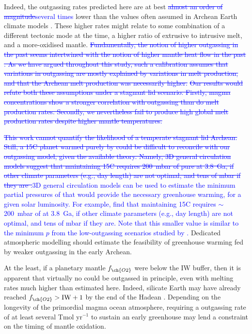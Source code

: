 \documentclass[3p,authoryear]{elsarticle}
\newcommand{\editthree}[2]{\textcolor{blue}{\sout{#1}#2}}
\begin{document}
Indeed, the  outgassing rates predicted here are at best \editthree{almost an order of magnitude}{several times} lower than the values often assumed in Archean Earth climate models \citep[e.g.][]{Sleep2001, Wordsworth2013, CHARNAY2017, KANZAKI2018, KT2018}. These higher rates might relate to some combination of a different tectonic mode at the time, a higher ratio of extrusive to intrusive melt, and a more-oxidised mantle. \editthree{Fundamentally, the notion of higher outgassing in the past seems intertwined with the notion of higher mantle heat flow in the past \citep[e.g.,][]{TURCOTTE1980}. As we have argued throughout this study, such a calibration assumes that variations in outgassing are mostly explained by variations in melt production, and that the Archean melt production was necessarily higher.}{} \editthree{Our results would refute both these assumptions under a stagnant lid scenario. Firstly, \ch{CO2} magma concentrations show a stronger correlation with \ch{CO2} outgassing than do melt production rates. Secondly, we nevertheless fail to produce high global melt production rates despite higher mantle temperatures.}{} 



\editthree{This work cannot quantify the likelihood of a temperate stagnant lid Archean. Still, a 15\degree C planet warmed purely by \ch{CO2} could be difficult to reconcile with our outgassing model, given the available theory. Namely, 3D general circulation models suggest that maintaining 15\degree C requires 200~mbar of pure \ch{CO2} at 3.8~Ga, if other climate parameters (e.g., day length) are not optimal, and tens of mbar if they are \citep{Wolf2014}.}{3D general circulation models can be used to estimate the minimum partial pressures of \ch{CO2} that would provide the necessary greenhouse warming, for a given solar luminosity. For example, \citet{Wolf2014} find that maintaining 15\degree C requires $\sim$200~mbar of \ch{CO2} at 3.8~Ga, if other climate parameters (e.g., day length) are not optimal, and tens of mbar if they are. Note that this smaller value is similar to the minimum $p$\ch{CO2} from the low-outgassing scenarios studied by \citet{KT2018}.} Dedicated atmospheric modelling should estimate the feasibility of greenhouse warming fed by weaker outgassing in the early Archean. 

At the least, if a planetary mantle $f_{\ch{O2}}$ were below the IW buffer, then it is apparent that virtually no  could be outgassed in principle, even with melting rates much higher than estimated here. Indeed, silicate Earth may have already reached $f_{\ch{O2}} > {\rm IW} + 1$ by the end of the Hadean \citep{Pahlevan2019}. Depending on the longevity of the primordial magma ocean atmosphere, requiring a  outgassing rate of at least several Tmol yr$^{-1}$ to sustain an early greenhouse may lend a constraint on the timing of mantle oxidation.
\end{document}
